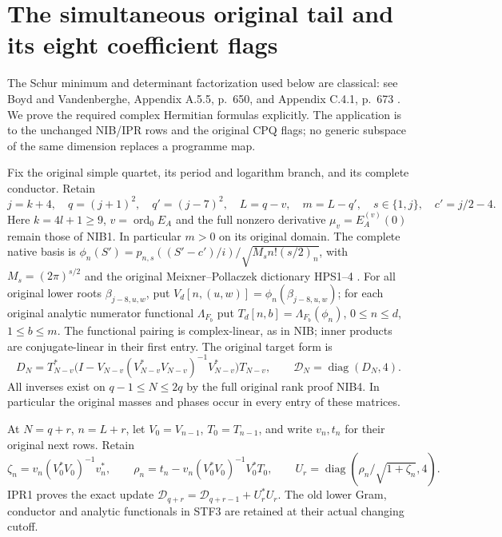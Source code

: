 \begingroup
\section{The simultaneous original tail and its eight coefficient flags}
\label{sec:STF}

The Schur minimum and determinant factorization used below are classical:
see Boyd and Vandenberghe, Appendix A.5.5, p.~650, and Appendix C.4.1,
p.~673 \cite{human:boyd-vandenberghe}. We prove the required complex
Hermitian formulas explicitly. The application is to the unchanged
NIB/IPR rows and the original CPQ flags; no generic subspace of the same
dimension replaces a programme map.

Fix the original simple quartet, its period and logarithm branch, and its
complete conductor. Retain
\[
 j=k+4,\quad q=(j+1)^2,\quad q'=(j-7)^2,\quad
 L=q-v,\quad m=L-q',\quad s\in\{1,j\},\quad c'=j/2-4 .       \tag{STF1}
\]
Here $k=4l+1\ge9$, $v=\operatorname{ord}_0 E_A$ and the full
nonzero derivative $\mu_v=E_A^{(v)}(0)$ remain those of NIB1.
In particular $m>0$ on its original domain. The complete native basis is
$\phi_n(S')=p_{n,s}((S'-c')/i)/\sqrt{M_sn!(s/2)_n}$, with
$M_s=(2\pi)^{s/2}$ and the original Meixner--Pollaczek dictionary
HPS1--4 \cite[eqs.~(18.19.8)--(18.19.9), (18.22.8)]{human:dlmf18}.
For all original lower roots $\beta_{j-8,u,w}$, put
$V_d[n,(u,w)]=\phi_n(\beta_{j-8,u,w})$; for each original analytic
numerator functional $\Lambda_{F_b}$ put
$T_d[n,b]=\Lambda_{F_b}(\phi_n)$, $0\le n\le d$, $1\le b\le m$.
The functional pairing is complex-linear, as in NIB; inner products
are conjugate-linear in their first entry. The original target form is
\[
 D_N=T_{N-v}^*\bigl(I-V_{N-v}(V_{N-v}^*V_{N-v})^{-1}
                         V_{N-v}^*\bigr)T_{N-v},
 \qquad \mathcal D_N=\operatorname{diag}(D_N,4).             \tag{STF2}
\]
All inverses exist on $q-1\le N\le2q$ by the full original rank
proof NIB4. In particular the original masses and phases occur in
every entry of these matrices.

At $N=q+r$, $n=L+r$, let $V_0=V_{n-1}$, $T_0=T_{n-1}$, and
write $v_n,t_n$ for their original next rows. Retain
\[
 \zeta_n=v_n(V_0^*V_0)^{-1}v_n^*,\qquad
 \rho_n=t_n-v_n(V_0^*V_0)^{-1}V_0^*T_0,
 \qquad U_r=\operatorname{diag}
              (\rho_n/\sqrt{1+\zeta_n},4).                \tag{STF3}
\]
IPR1 proves the exact update
$\mathcal D_{q+r}=\mathcal D_{q+r-1}+U_r^*U_r$.
The old lower Gram, conductor and analytic functionals in STF3 are
retained at their actual changing cutoff.

